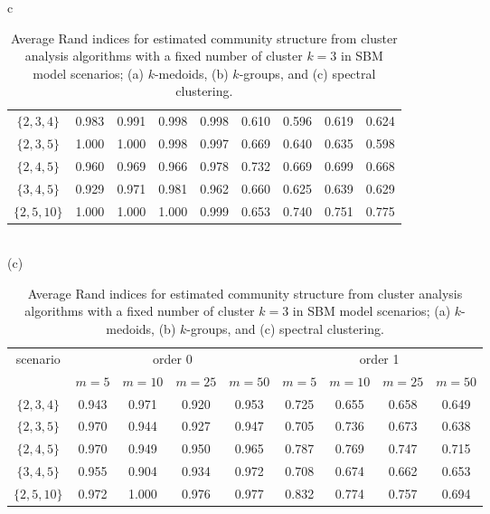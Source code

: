 \documentclass[12pt]{article}
\begin{document}
\begin{appendices}
\begin{table}[htbp]
{\begin{tabular}{c}
\begin{subtable}{\textwidth}
\begin{tabular}{ccccccccc}
					$\lbrace 2,3,4\rbrace$ & 0.983 & 0.991 & 0.998 & 0.998 &0.610 & 0.596 & 0.619 & 0.624 \\ 
					$\lbrace 2,3,5\rbrace$ & 1.000 & 1.000 & 0.998 & 0.997 &0.669 & 0.640 & 0.635 & 0.598 \\ 
					$\lbrace 2,4,5\rbrace$ & 0.960 & 0.969 & 0.966 & 0.978 &0.732 & 0.669 & 0.699 & 0.668 \\ 
					$\lbrace 3,4,5\rbrace$ & 0.929 & 0.971 & 0.981 & 0.962 &0.660 & 0.625 & 0.639 & 0.629 \\ 
					$\lbrace 2,5,10\rbrace$& 1.000 & 1.000 & 1.000 & 0.999 &0.653 & 0.740 & 0.751 & 0.775 \\ 
					\hline
				\end{tabular}
			\end{subtable}%
			\\ (c) \\
			\begin{subtable}{\textwidth}
				\centering
				\begin{tabular}{ccccccccc}
					\hline
					\multirow{2}{*}{scenario} & \multicolumn{4}{c}{order 0} & \multicolumn{4}{c}{order 1} \\ \cline{2-9}
					& $m=5$     & $m=10$ & $m=25$ & $m=50$ & $m=5$     & $m=10$ & $m=25$ & $m=50$ \\ \hline
					$\lbrace 2,3,4\rbrace$ & 0.943 & 0.971 & 0.920 & 0.953 & 0.725 & 0.655 & 0.658 & 0.649 \\ 
					$\lbrace 2,3,5\rbrace$ & 0.970 & 0.944 & 0.927 & 0.947 & 0.705 & 0.736 & 0.673 & 0.638 \\ 
					$\lbrace 2,4,5\rbrace$ & 0.970 & 0.949 & 0.950 & 0.965 & 0.787 & 0.769 & 0.747 & 0.715 \\ 
					$\lbrace 3,4,5\rbrace$ & 0.955 & 0.904 & 0.934 & 0.972 & 0.708 & 0.674 & 0.662 & 0.653 \\ 
					$\lbrace 2,5,10\rbrace$& 0.972 & 1.000 & 0.976 & 0.977 & 0.832 & 0.774 & 0.757 & 0.694 \\ 
					\hline
				\end{tabular}
			\end{subtable}%
		\end{tabular}
	}
	\caption{Average Rand indices for estimated community structure from cluster analysis algorithms with a fixed number of cluster $k=3$ in SBM model scenarios; (a) $k$-medoids, (b) $k$-groups, and (c) spectral clustering.}
	\label{tab:results_SBM_clustering}
\end{table}
\end{appendices}
\end{document}

